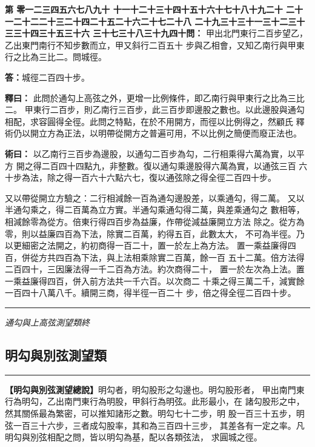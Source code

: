 \documentclass[11pt,a4paper]{article}
\newcommand{\longline}{\noindent\rule{\textwidth}{0.4pt}}
\newcounter{probnum}
\newcommand{\chnum}[1]{%
  \ifcase#1 零\or 一\or 二\or 三\or 四\or 五\or 六\or 七\or 八\or 九\or 十\or
    十一\or 十二\or 十三\or 十四\or 十五\or 十六\or 十七\or 十八\or 十九\or 二十\or
    二十一\or 二十二\or 二十三\or 二十四\or 二十五\or 二十六\or 二十七\or 二十八\or
    二十九\or 三十\or 三十一\or 三十二\or 三十三\or 三十四\or 三十五\or 三十六\or
    三十七\or 三十八\or 三十九\or 四十\fi}
\newcommand{\problem}[1]{\stepcounter{probnum}\par\noindent\textbf{第\chnum{\value{probnum}}問：}#1\par}
\newcommand{\answer}[1]{\par\noindent\textbf{答：}#1\par}
\newcommand{\shiyi}[1]{\par\noindent\textbf{釋曰：}#1\par}
\newcommand{\shuyue}[1]{\par\noindent\textbf{術曰：}#1\par}
\begin{document}
\vspace{0.3cm}
\problem{
甲出北門東行二百步望乙，乙出東門南行不知步數而立，甲又斜行二百五十
步與乙相會，又知乙南行與甲東行之比為三比二。問城徑。
}

\answer{城徑二百四十步。}

\shiyi{
此問於通勾上高弦之外，更增一比例條件，即乙南行與甲東行之比為三比二。
甲東行二百步，則乙南行三百步，此三百步即邊股之數也。以此邊股與通勾
相配，求容圓得全徑。此問之特點，在於不用開方，而徑以比例得之，然顧氏
釋術仍以開立方為正法，以明帶從開方之普遍可用，不以比例之簡便而廢正法也。
}

\shuyue{
以乙南行三百步為邊股，以通勾二百步為勾，二行相乘得六萬為實，以平方
開之得二百四十四點九，非整數。復以通勾乘邊股得六萬為實，以通弦三百
六十步為法，除之得一百六十六點六七，復以通弦除之得全徑二百四十步。

又以帶從開立方驗之：二行相減餘一百為通勾邊股差，以乘通勾，得二萬。
又以半通勾乘之，得二百萬為立方實。半通勾乘通勾得二萬，與差乘通勾之
數相等，相減餘零為從方。倍東行得四百步為益廉，作帶從減益廉開立方法
除之。從方為零，則以益廉四百為下法，除實二百萬，約得五百，此數太大，
不可為半徑。乃以更細密之法開之，約初商得一百二十，置一於左上為方法。
置一乘益廉得四百，併從方共四百為下法，與上法相乘除實二百萬，餘一百
五十二萬。倍方法得二百四十，三因廉法得一千二百為方法。約次商得二十，
置一於左次為上法。置一乘益廉得四百，併入前方法共一千六百。以次商二
十乘之得三萬二千，減實餘一百四十八萬八千。續開三商，得半徑一百二十
步，倍之得全徑二百四十步。
}

\vspace{0.5cm}
\longline
\begin{center}
\textit{通勾與上高弦測望類終}
\end{center}

\newpage
\setcounter{probnum}{0}

\subsection*{明勾與別弦測望類}
\vspace{0.3cm}
\longline
\vspace{0.3cm}

\noindent
\textbf{【明勾與別弦測望總說】}明勾者，明勾股形之勾邊也。明勾股形者，
甲出南門東行為明勾，乙出南門東行為明股，甲斜行為明弦。此形最小，在
諸勾股形之中，然其關係最為繁密，可以推知諸形之數。明勾七十二步，明
股一百三十五步，明弦一百三十六步，三者成勾股率，其和為三百四十三步，
其差各有一定之率。凡明勾與別弦相配之問，皆以明勾為基，配以各類弦法，
求圓城之徑。
\end{document}
